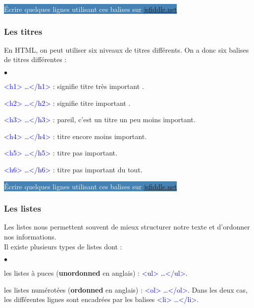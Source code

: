 \documentclass[10pt,dvipsnames, dvips, svgnames]{article}
\begin{document}
\hypersetup{urlcolor=white}
\colorbox{SteelBlue}{\textcolor{white}{Écrire quelques lignes utilisant ces balises  sur \href{https://jsfiddle.net/}{jsfiddle.net}}}
\hypersetup{urlcolor=blue}


\subsubsection{Les titres}

En HTML, on peut utiliser six niveaux de titres différents.  On a donc six balises de titres différentes :

\begin{list}{$\bullet$}{}
\item  \textcolor{Blue}{<h1> \dots </h1>} : signifie \og titre très important \fg.
\item  \textcolor{Blue}{<h2> \dots </h2>} : signifie \og titre important \fg.
\item  \textcolor{Blue}{<h3> \dots </h3>} : pareil, c'est un titre un peu moins important.
\item  \textcolor{Blue}{<h4> \dots </h4>} : titre encore moins important.
\item  \textcolor{Blue}{<h5> \dots </h5>} : titre pas important.
\item  \textcolor{Blue}{<h6> \dots </h6>} : titre pas important du tout.
\end{list}


\hypersetup{urlcolor=white}
\colorbox{SteelBlue}{\textcolor{white}{Écrire quelques lignes   utilisant ces balises  sur \href{https://jsfiddle.net/}{jsfiddle.net}}}
\hypersetup{urlcolor=blue}

\subsubsection{Les listes}

Les listes nous permettent souvent de mieux structurer notre texte et d'ordonner nos informations.\\
Il existe plusieurs types de listes dont :


\begin{list}{$\bullet$}{}
\item  les listes à puces (\textbf{unordonned} en anglais) : \textcolor{Blue}{<ul> \dots </ul>}.
\item  les listes numérotées (\textbf{ordonned} en anglais) : \textcolor{Blue}{ <ol> \dots </ol>}.
Dans les deux cas, les différentes lignes sont encadrées par les balises  \textcolor{Blue}{<li> \dots </li>}.
\end{list}
\end{document}
